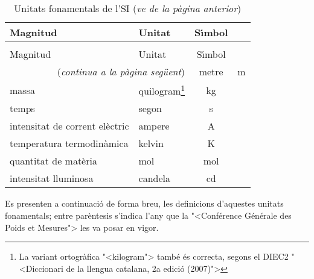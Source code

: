 \begin{longtable}[h]{llc}
   \caption{\label{taula:SI-fonamentals} Unitats fonamentals de l'SI}\\
   \toprule[1pt]
    Magnitud & Unitat & S\'{\i}mbol \\
   \midrule
   \endfirsthead
   \caption[]{Unitats fonamentals de l'SI (\emph{ve de la p\`{a}gina anterior})}\\
   \toprule[1pt]
    Magnitud & Unitat & S\'{\i}mbol \\
   \midrule
   \endhead
   \midrule
   \multicolumn{2}{r}{(\emph{continua a la p\`{a}gina seg\"{u}ent})}
   \endfoot
   \endlastfoot
   longitud & metre & m \\
   massa & quilogram\footnote{La variant ortogr\`{a}fica {"<}kilogram{">} tamb\'{e} \'{e}s correcta, segons el DIEC2 {"<}Diccionari de la llengua catalana, 2a edici\'{o} (2007){">}} & kg \\
   temps & segon & s\\
   intensitat de corrent el\`{e}ctric & ampere & A \\
   temperatura termodin\`{a}mica & kelvin & K\\
   quantitat de mat\`{e}ria & mol & mol \\
   intensitat lluminosa & candela &  cd \\
   \bottomrule[1pt]
\end{longtable}
   
   
  
 
   
  

Es presenten a continuaci\'{o} de forma breu, les definicions
d'aquestes unitats fonamentals; entre par\`{e}ntesis s'indica l'any
que la {"<}Conf\'{e}rence G\'{e}n\'{e}rale des Poids et Mesures{">} les va posar en
vigor.



